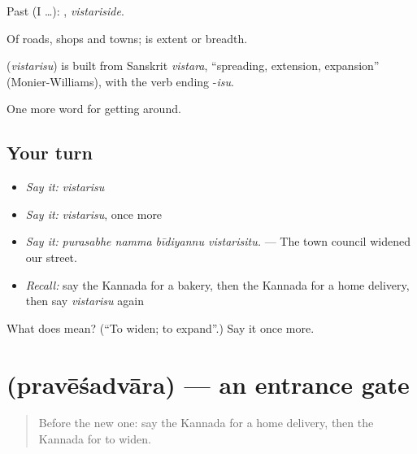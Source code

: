 Past (I …): , \emph{vistariside}.

Of roads, shops and towns;  is extent or breadth.

\begin{cousinweb}
\textbf{} (\emph{vistarisu}) is built from Sanskrit \emph{vistara}, \textquotedblleft{}spreading, extension, expansion\textquotedblright{} (Monier-Williams), with the verb ending -\emph{isu}.
\end{cousinweb}

\begin{grammarlens}[title={What you've built}]
One more word for getting around.
\end{grammarlens}

\subsection*{Your turn}
\begin{itemize}
\raggedright
  \item \emph{Say it:} \emph{vistarisu}
  \item \emph{Say it:} \emph{vistarisu}, once more
  \item \emph{Say it:} \emph{purasabhe namma bīdiyannu vistarisitu.} — The town council widened our street.
  \item \emph{Recall:} say the Kannada for a bakery, then the Kannada for a home delivery, then say \emph{vistarisu} again
\end{itemize}

\begin{tcolorbox}[breakable,colback=teal!4,colframe=teal!35!black,title={Before you move on}]
What does  mean? (\textquotedblleft{}To widen; to expand\textquotedblright{}.) Say it once more.
\end{tcolorbox}
\section[\texorpdfstring{\kn{ಪ್ರವೇಶದ್ವಾರ} (pravēśadvāra)}{ಪ್ರವೇಶದ್ವಾರ (pravēśadvāra)}]{ (pravēśadvāra) — an entrance gate}

\label{lesson:KA-C470-pravesadvara}



\begin{quote}
Before the new one: say the Kannada for a home delivery, then the Kannada for to widen.
\end{quote}

